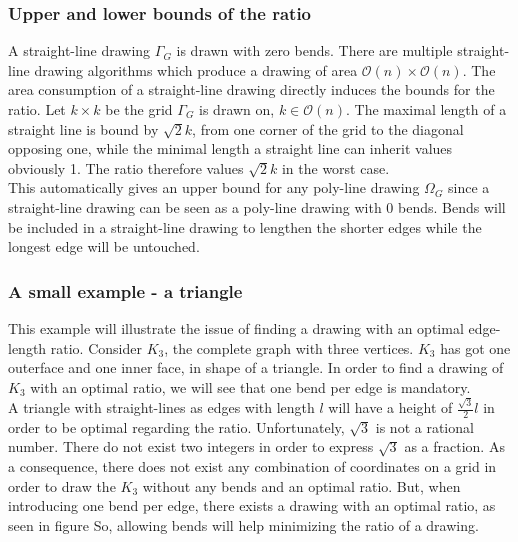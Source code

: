 \subsubsection{Upper and lower bounds of the ratio}
A straight-line drawing $\Gamma_G$ is drawn with zero bends. There are multiple straight-line drawing algorithms which produce a drawing of area $\mathcal{O}(n)\times\mathcal{O}(n)$. The area consumption of a straight-line drawing directly induces the bounds for the ratio. Let $k\times k$ be the grid $\Gamma_G$ is drawn on, $k\in \mathcal{O}(n)$. The maximal length of a straight line is bound by $\sqrt{2}k$, from one corner of the grid to the diagonal opposing one, while the minimal length a straight line can inherit values obviously 1. The ratio therefore values $\sqrt{2}k$ in the worst case.\\
This automatically gives an upper bound for any poly-line drawing $\Omega_G$ since a straight-line drawing can be seen as a poly-line drawing with 0 bends. Bends will be included in a straight-line drawing to lengthen the shorter edges while the longest edge will be untouched.
\subsubsection{A small example - a triangle}
This example will illustrate the issue of finding a drawing with an optimal edge-length ratio. Consider $K_3$, the complete graph with three vertices. $K_3$ has got one outerface and one inner face, in shape of a triangle. In order to find a drawing of $K_3$ with an optimal ratio, we will see that one bend per edge is mandatory.\\
A triangle with straight-lines as edges with length $l$ will have a height of $\frac{\sqrt{3}}{2}l$ in order to be optimal regarding the ratio. Unfortunately, $\sqrt{3}$ is not a rational number. There do not exist two integers in order to express $\sqrt{3}$ as a fraction. As a consequence, there does not exist any combination of coordinates on a grid in order to draw the $K_3$ without any bends and an optimal ratio.
But, when introducing one bend per edge, there exists a drawing with an optimal ratio, as seen in figure 
So, allowing bends will help minimizing the ratio of a drawing. 